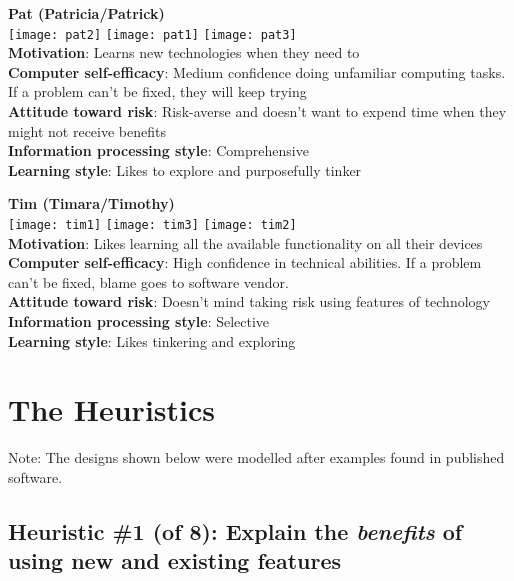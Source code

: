 \begin{tcolorbox}[colback=patcolor!100!white,colframe=patcolor2!100!black]
{\Large \textbf{Pat (Patricia/Patrick)}}\\
\texttt{[image: pat2]}
\texttt{[image: pat1]}
\texttt{[image: pat3]}\\
\textbf{Motivation}: Learns new technologies when they need to\\
\textbf{Computer self-efficacy}: Medium confidence doing unfamiliar computing tasks. If a problem can't be fixed, they will keep trying\\
\textbf{Attitude toward risk}: Risk-averse and doesn't want to expend time when they might not receive benefits\\
\textbf{Information processing style}: Comprehensive\\
\textbf{Learning style}: Likes to explore and purposefully tinker
\end{tcolorbox}

\begin{tcolorbox}[colback=timcolor!100!white,colframe=timcolor2!100!black]
{\Large \textbf{Tim (Timara/Timothy)}}\\
\texttt{[image: tim1]}
\texttt{[image: tim3]}
\texttt{[image: tim2]}\\
\textbf{Motivation}: Likes learning all the available functionality on all their devices\\
\textbf{Computer self-efficacy}: High confidence in technical abilities. If a problem can't be fixed, blame goes to software vendor.\\
\textbf{Attitude toward risk}: Doesn't mind taking risk using features of technology\\
\textbf{Information processing style}: Selective\\
\textbf{Learning style}: Likes tinkering and exploring
\end{tcolorbox}

\section{The Heuristics}

Note: The designs shown below were modelled after examples found in published software.

\subsection{Heuristic \#1 (of 8): Explain the \textit{benefits} of using new and existing features}

